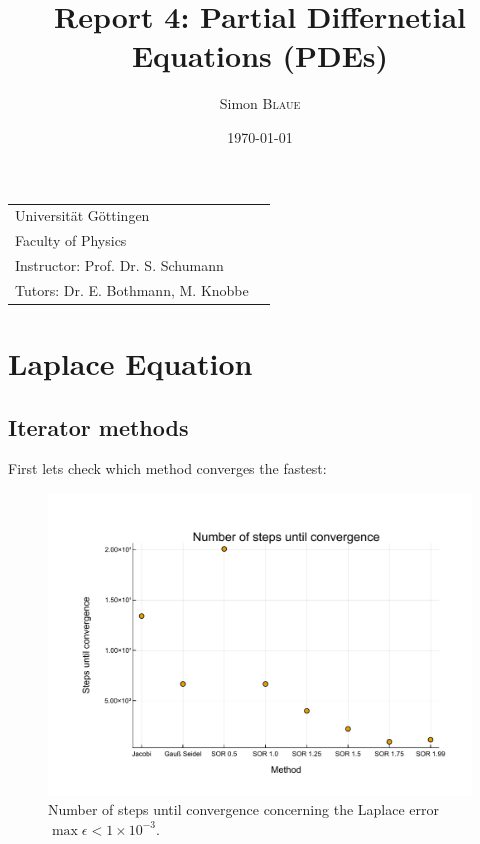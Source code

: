 \documentclass[
	a4paper, %
	10pt, %
]{CSUniSchoolLabReport}
\title{Report 4: Partial Differnetial Equations (PDEs)} %
\author{Simon \textsc{Blaue}} %
\date{\today} %
\begin{document}
\maketitle %


\begin{tabular}{l r}
	Universität Göttingen \\ %
	Faculty of Physics \\
	Instructor: Prof. Dr. S. Schumann \\
	Tutors: Dr. E. Bothmann, M. Knobbe \\ %
\end{tabular}



\vspace*{50px}

\section{Laplace Equation}

\subsection{Iterator methods}

First lets check which method converges the fastest:

\begin{figure}[H]
	\centering
	\includegraphics[width=\textwidth]{../saves_t1/number_of_convergence_steps.pdf}
	\caption{Number of steps until convergence concerning the Laplace error $\max\epsilon<1\times 10^{-3}$.}
\end{figure}
\end{document}
